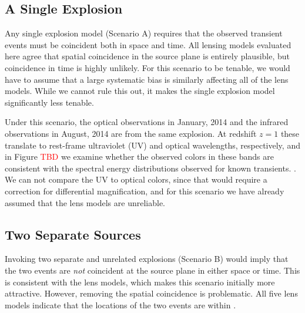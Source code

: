


\subsection{A Single Explosion}

Any single explosion model (Scenario A) requires that the observed
transient events must be coincident both in space and time.  All
lensing models evaluated here agree that spatial coincidence in the
source plane is entirely plausible, but coincidence in time is highly
unlikely. For this scenario to be tenable, we would have to assume
that a large systematic bias is similarly affecting all of the lens
models.  While we cannot rule this out, it makes the single explosion
model significantly less tenable. 

Under this scenario, the optical observations in January, 2014 and the
infrared observations in August, 2014 are from the same explosion. At
redshift $z=1$ these translate to rest-frame ultraviolet (UV) and
optical wavelengths, respectively, and in Figure \textcolor{red}{TBD}
we examine whether the observed colors in these bands are consistent
with the spectral energy distributions observed for known transients.
.  We can not
compare the UV to optical colors, since that would require a
correction for differential magnification, and for this scenario we
have already assumed that the lens models are unreliable. 


\subsection{Two Separate Sources}

Invoking two separate and unrelated explosions (Scenario B) would
imply that the two events are {\it not} coincident at the source plane
in either space or time.  This is consistent with the lens models,
which makes this scenario initially more attractive.  However,
removing the spatial coincidence is problematic.  All five lens models
indicate that the locations of the two events are within .


